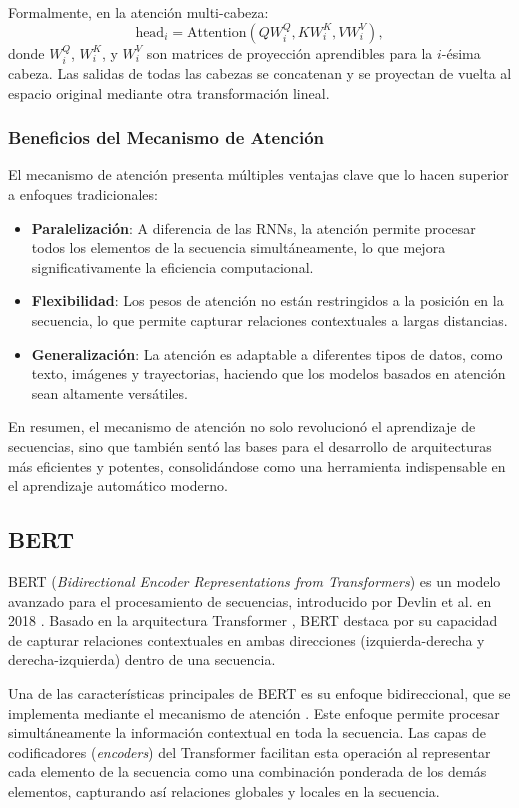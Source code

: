 Formalmente, en la atención multi-cabeza:
\[
\text{head}_i = \text{Attention}(QW_i^Q, KW_i^K, VW_i^V),
\]
donde \(W_i^Q\), \(W_i^K\), y \(W_i^V\) son matrices de proyección aprendibles para la \(i\)-ésima cabeza. Las salidas de todas las cabezas se concatenan y se proyectan de vuelta al espacio original mediante otra transformación lineal.

\subsubsection*{Beneficios del Mecanismo de Atención}

El mecanismo de atención presenta múltiples ventajas clave que lo hacen superior a enfoques tradicionales:
\begin{itemize}
    \item \textbf{Paralelización}: A diferencia de las RNNs, la atención permite procesar todos los elementos de la secuencia simultáneamente, lo que mejora significativamente la eficiencia computacional.
    \item \textbf{Flexibilidad}: Los pesos de atención no están restringidos a la posición en la secuencia, lo que permite capturar relaciones contextuales a largas distancias.
    \item \textbf{Generalización}: La atención es adaptable a diferentes tipos de datos, como texto, imágenes y trayectorias, haciendo que los modelos basados en atención sean altamente versátiles.
\end{itemize}

En resumen, el mecanismo de atención no solo revolucionó el aprendizaje de secuencias, sino que también sentó las bases para el desarrollo de arquitecturas más eficientes y potentes, consolidándose como una herramienta indispensable en el aprendizaje automático moderno.

\subsection{BERT}

BERT (\textit{Bidirectional Encoder Representations from Transformers}) es un modelo avanzado para el procesamiento de secuencias, introducido por Devlin et al. en 2018 \cite{devlin2018bert}. Basado en la arquitectura Transformer \cite{vaswani2017attention}, BERT destaca por su capacidad de capturar relaciones contextuales en ambas direcciones (izquierda-derecha y derecha-izquierda) dentro de una secuencia.

Una de las características principales de BERT es su enfoque bidireccional, que se implementa mediante el mecanismo de atención \cite{vaswani2017attention}. Este enfoque permite procesar simultáneamente la información contextual en toda la secuencia. Las capas de codificadores (\textit{encoders}) del Transformer facilitan esta operación al representar cada elemento de la secuencia como una combinación ponderada de los demás elementos, capturando así relaciones globales y locales en la secuencia.

